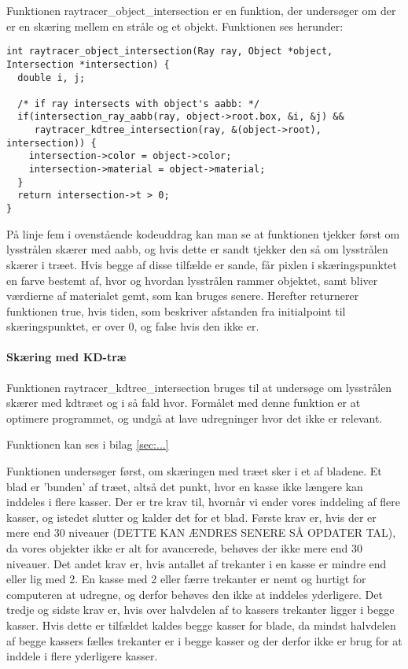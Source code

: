 Funktionen raytracer\_object\_intersection er en funktion, der undersøger om der er en skæring mellem en stråle og et objekt. Funktionen ses herunder:

\begin{lstlisting}[style=Cstyle, caption=raytracer\_object\_intersection]
int raytracer_object_intersection(Ray ray, Object *object, Intersection *intersection) {
  double i, j;
  
  /* if ray intersects with object's aabb: */
  if(intersection_ray_aabb(ray, object->root.box, &i, &j) && 
     raytracer_kdtree_intersection(ray, &(object->root), intersection)) {
    intersection->color = object->color;
    intersection->material = object->material;
  }
  return intersection->t > 0;
}
\end{lstlisting}

På linje fem i ovenstående kodeuddrag kan man se at funktionen tjekker først om lysstrålen skærer med aabb, og hvis dette er sandt tjekker den så om lysstrålen skærer i træet. Hvis begge af disse tilfælde er sande, får pixlen i skæringspunktet en farve bestemt af, hvor og hvordan lysstrålen rammer objektet, samt bliver værdierne af materialet gemt, som kan bruges senere. Herefter returnerer funktionen true, hvis tiden, som beskriver afstanden fra initialpoint til skæringspunktet, er over 0, og false hvis den ikke er.

\paragraph{Skæring med KD-træ}

Funktionen raytracer\_kdtree\_intersection bruges til at undersøge om lysstrålen skærer med kdtræet og i så fald hvor. Formålet med denne funktion er at optimere programmet, og undgå at lave udregninger hvor det ikke er relevant. 

Funktionen kan ses i bilag \ref{sec:...}

Funktionen undersøger først, om skæringen med træet sker i et af bladene. Et blad er 'bunden' af træet, altså det punkt, hvor en kasse ikke længere kan inddeles i flere kasser. Der er tre krav til, hvornår vi ender vores inddeling af flere kasser, og istedet slutter og kalder det for et blad. Første krav er, hvis der er mere end 30 niveauer (DETTE KAN ÆNDRES SENERE  SÅ OPDATER TAL), da vores objekter ikke er alt for avancerede, behøves der ikke mere end 30 niveauer. Det andet krav er, hvis antallet af trekanter i en kasse er mindre end eller lig med 2. En kasse med 2 eller færre trekanter er nemt og hurtigt for computeren at udregne, og derfor behøves den ikke at inddeles yderligere. Det tredje og sidste krav er, hvis over halvdelen af to kassers trekanter ligger i begge kasser. Hvis dette er tilfældet kaldes begge kasser for blade, da mindst halvdelen af begge kassers fælles trekanter er i begge kasser og der derfor ikke er brug for at inddele i flere yderligere kasser.

